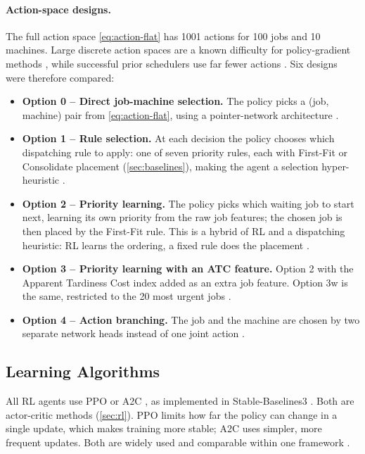 \documentclass[12pt]{article}
\begin{document}
\paragraph{Action-space designs.} The full action space \cref{eq:action-flat} has 1001 actions for 100 jobs and 10 machines. Large discrete action spaces are a known difficulty for policy-gradient methods \cite{dulacarnold2015largeactionspaces}, while successful prior schedulers use far fewer actions \cite{mao2016deeprm, mao2019decima}. Six designs were therefore compared:
\begin{itemize}
    \item \textbf{Option 0 -- Direct job-machine selection.} The policy picks a (job, machine) pair from \cref{eq:action-flat}, using a pointer-network architecture \cite{vinyals2015pointernet, kool2019attention}.
    \item \textbf{Option 1 -- Rule selection.} At each decision the policy chooses which dispatching rule to apply: one of seven priority rules, each with First-Fit or Consolidate placement (\cref{sec:baselines}), making the agent a selection hyper-heuristic \cite{burke2013hyperheuristicsurvey, lassoued2026hyperheuristic}.
    \item \textbf{Option 2 -- Priority learning.} The policy picks which waiting job to start next, learning its own priority from the raw job features; the chosen job is then placed by the First-Fit rule. This is a hybrid of RL and a dispatching heuristic: RL learns the ordering, a fixed rule does the placement \cite{mao2016deeprm, min2022atctuning}.
    \item \textbf{Option 3 -- Priority learning with an ATC feature.} Option 2 with the Apparent Tardiness Cost index \cite{vepsalainen1987atc} added as an extra job feature. Option 3w is the same, restricted to the 20 most urgent jobs \cite{mao2016deeprm}.
    \item \textbf{Option 4 -- Action branching.} The job and the machine are chosen by two separate network heads instead of one joint action \cite{tavakoli2018actionbranching}.
\end{itemize}

\subsection{Learning Algorithms}\label{sec:algorithms}
All RL agents use PPO \cite{schulman2017ppo} or A2C \cite{mnih2016a3c}, as implemented in Stable-Baselines3 \cite{raffin2021sb3}. Both are actor-critic methods (\cref{sec:rl}). PPO limits how far the policy can change in a single update, which makes training more stable; A2C uses simpler, more frequent updates. Both are widely used and comparable within one framework \cite{huang2022a2cppo}.
\end{document}
